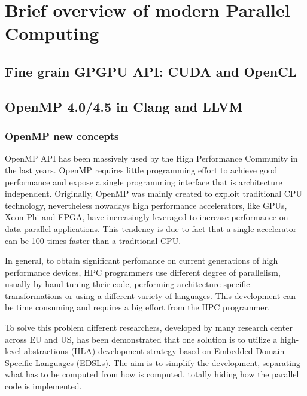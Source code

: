 \chapter{Brief overview of modern Parallel Computing}

\section{Fine grain GPGPU API: CUDA and OpenCL}

\section{OpenMP 4.0/4.5 in Clang and LLVM}

\subsection{OpenMP new concepts}

OpenMP API has been massively used by the High Performance Community in the last years.
OpenMP requires little programming effort to achieve good performance and expose a single programming interface that is architecture independent. Originally, OpenMP was mainly created to exploit traditional CPU technology, nevertheless nowadays high performance accelerators, like GPUs, Xeon Phi and FPGA, have increasingly leveraged to increase performance on data-parallel applications. This tendency is due to fact that a single accelerator can be 100 times faster than a traditional CPU.


In general, to obtain significant perfomance on current generations of high performance devices, HPC programmers use different degree of parallelism, usually by hand-tuning their code, performing architecture-specific transformations or using a different variety of languages. This development can be time consuming and requires a big effort from the HPC programmer.



To solve this problem different researchers, developed by many research center across EU and US, has been demonstrated that one solution is to utilize a high-level abstractions (HLA) development strategy based on Embedded Domain Specific Languages (EDSLs). The aim is to simplify the development, separating what has to be computed from how is computed, totally hiding how the parallel code is implemented. 

